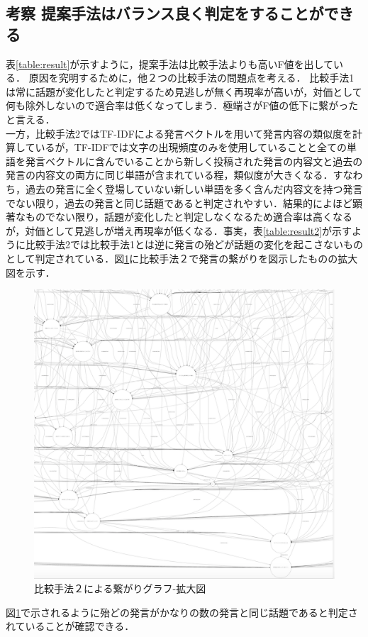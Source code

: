 \subsection*{考察 提案手法はバランス良く判定をすることができる}
表\ref{table:result}が示すように，提案手法は比較手法よりも高いF値を出している．
原因を究明するために，他２つの比較手法の問題点を考える．
比較手法1は常に話題が変化したと判定するため見逃しが無く再現率が高いが，対価として何も除外しないので適合率は低くなってしまう．極端さがF値の低下に繋がったと言える．\\
一方，比較手法2ではTF-IDFによる発言ベクトルを用いて発言内容の類似度を計算しているが，TF-IDFでは文字の出現頻度のみを使用していることと全ての単語を発言ベクトルに含んでいることから新しく投稿された発言の内容文と過去の発言の内容文の両方に同じ単語が含まれている程，類似度が大きくなる．すなわち，過去の発言に全く登場していない新しい単語を多く含んだ内容文を持つ発言でない限り，過去の発言と同じ話題であると判定されやすい．結果的によほど顕著なものでない限り，話題が変化したと判定しなくなるため適合率は高くなるが，対価として見逃しが増え再現率が低くなる．事実，表\ref{table:result2}が示すように比較手法2では比較手法1とは逆に発言の殆どが話題の変化を起こさないものとして判定されている．図\ref{Fig:GraphTF-IDF}に比較手法２で発言の繋がりを図示したものの拡大図を示す．\\
\begin{figure}[htbp]
 \begin{center}
  \includegraphics[width=\textwidth]{../images/5.Experiment/Graph=TF-IDF2.png}
  \caption{比較手法２による繋がりグラフ-拡大図}
  \label{Fig:GraphTF-IDF}
  \vspace{-10pt}
 \end{center}
\end{figure}
図\ref{Fig:GraphTF-IDF}で示されるように殆どの発言がかなりの数の発言と同じ話題であると判定されていることが確認できる．


